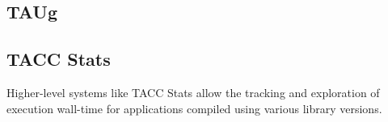 \subsection{TAUg} %
%
%
\subsection{TACC Stats} %
%
Higher-level systems like TACC Stats \cite{evans2014comprehensive}
allow the tracking and exploration of execution wall-time for
applications compiled using various library versions.
%




